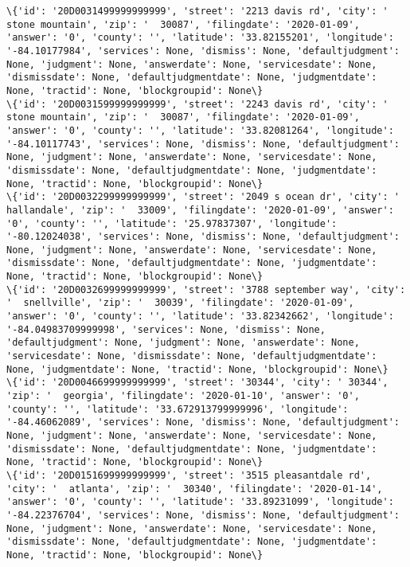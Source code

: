 \documentclass[11pt]{article}
\begin{document}
\begin{Verbatim}[commandchars=\\\{\}]
\{'id': '20D0031499999999999', 'street': '2213 davis rd', 'city': '  stone mountain', 'zip': '  30087', 'filingdate': '2020-01-09', 'answer': '0', 'county': '', 'latitude': '33.82155201', 'longitude': '-84.10177984', 'services': None, 'dismiss': None, 'defaultjudgment': None, 'judgment': None, 'answerdate': None, 'servicesdate': None, 'dismissdate': None, 'defaultjudgmentdate': None, 'judgmentdate': None, 'tractid': None, 'blockgroupid': None\}
\{'id': '20D0031599999999999', 'street': '2243 davis rd', 'city': '  stone mountain', 'zip': '  30087', 'filingdate': '2020-01-09', 'answer': '0', 'county': '', 'latitude': '33.82081264', 'longitude': '-84.10117743', 'services': None, 'dismiss': None, 'defaultjudgment': None, 'judgment': None, 'answerdate': None, 'servicesdate': None, 'dismissdate': None, 'defaultjudgmentdate': None, 'judgmentdate': None, 'tractid': None, 'blockgroupid': None\}
\{'id': '20D0032299999999999', 'street': '2049 s ocean dr', 'city': '  hallandale', 'zip': '  33009', 'filingdate': '2020-01-09', 'answer': '0', 'county': '', 'latitude': '25.97837307', 'longitude': '-80.12024038', 'services': None, 'dismiss': None, 'defaultjudgment': None, 'judgment': None, 'answerdate': None, 'servicesdate': None, 'dismissdate': None, 'defaultjudgmentdate': None, 'judgmentdate': None, 'tractid': None, 'blockgroupid': None\}
\{'id': '20D0032699999999999', 'street': '3788 september way', 'city': '  snellville', 'zip': '  30039', 'filingdate': '2020-01-09', 'answer': '0', 'county': '', 'latitude': '33.82342662', 'longitude': '-84.04983709999998', 'services': None, 'dismiss': None, 'defaultjudgment': None, 'judgment': None, 'answerdate': None, 'servicesdate': None, 'dismissdate': None, 'defaultjudgmentdate': None, 'judgmentdate': None, 'tractid': None, 'blockgroupid': None\}
\{'id': '20D0046699999999999', 'street': '30344', 'city': ' 30344', 'zip': '  georgia', 'filingdate': '2020-01-10', 'answer': '0', 'county': '', 'latitude': '33.672913799999996', 'longitude': '-84.46062089', 'services': None, 'dismiss': None, 'defaultjudgment': None, 'judgment': None, 'answerdate': None, 'servicesdate': None, 'dismissdate': None, 'defaultjudgmentdate': None, 'judgmentdate': None, 'tractid': None, 'blockgroupid': None\}
\{'id': '20D0151699999999999', 'street': '3515 pleasantdale rd', 'city': '  atlanta', 'zip': '  30340', 'filingdate': '2020-01-14', 'answer': '0', 'county': '', 'latitude': '33.89231099', 'longitude': '-84.22376704', 'services': None, 'dismiss': None, 'defaultjudgment': None, 'judgment': None, 'answerdate': None, 'servicesdate': None, 'dismissdate': None, 'defaultjudgmentdate': None, 'judgmentdate': None, 'tractid': None, 'blockgroupid': None\}

\end{Verbatim}
\end{document}
